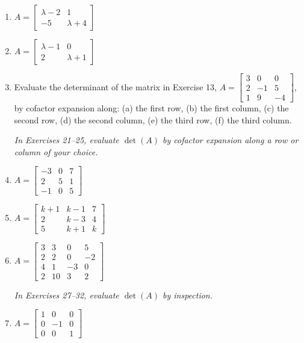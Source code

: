 \documentclass{article}
\theoremstyle{mystyle}
\begin{document}
\begin{enumerate}
\item[15.] $A=\begin{bmatrix}\lambda-2&1\\-5&\lambda+4\end{bmatrix}$

\item[17.] $A=\begin{bmatrix}\lambda-1&0\\2&\lambda+1\end{bmatrix}$

\item[19.] Evaluate the determinant of the matrix in Exercise 13,
$A=\begin{bmatrix}3&0&0\\2&-1&5\\1&9&-4\end{bmatrix}$,
by cofactor expansion along: (a) the first row,\; (b) the first column,\;
(c) the second row,\; (d) the second column,\; (e) the third row,\; (f) the third column.

\noindent\textit{In Exercises 21--25, evaluate $\det(A)$ by cofactor expansion along a row or column of your choice.}

\item[21.] $A=\begin{bmatrix}-3&0&7\\2&5&1\\-1&0&5\end{bmatrix}$

\item[24.] $A=\begin{bmatrix}k+1&k-1&7\\2&k-3&4\\5&k+1&k\end{bmatrix}$

\item[25.] $A=\begin{bmatrix}3&3&0&5\\2&2&0&-2\\4&1&-3&0\\2&10&3&2\end{bmatrix}$

\noindent\textit{In Exercises 27--32, evaluate $\det(A)$ by inspection.}

\item[27.] $A=\begin{bmatrix}1&0&0\\0&-1&0\\0&0&1\end{bmatrix}$


\end{enumerate}
\end{document}
